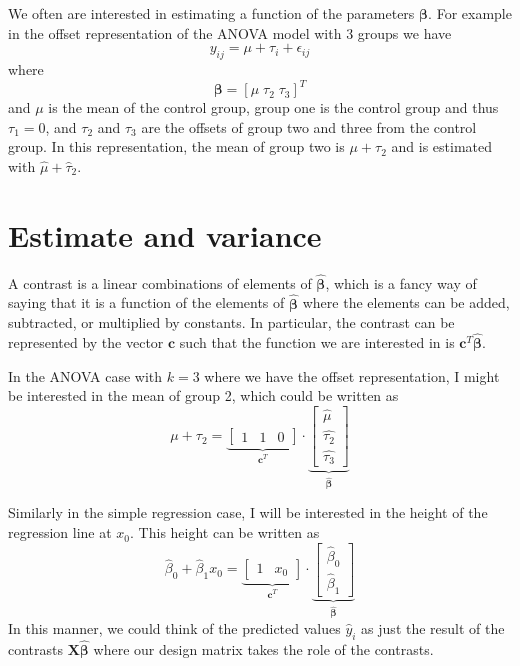 \documentclass[]{book}
\theoremstyle{definition}
\theoremstyle{definition}
\theoremstyle{remark}
\begin{document}
We often are interested in estimating a function of the parameters
\(\boldsymbol{\beta}\). For example in the offset representation of the
ANOVA model with 3 groups we have \[y_{ij}=\mu+\tau_{i}+\epsilon_{ij}\]
where \[
\boldsymbol{\beta}=\left[\mu\;\tau_{2}\;\tau_{3}\right]^{T}
\] and \(\mu\) is the mean of the control group, group one is the
control group and thus \(\tau_{1}=0\), and \(\tau_{2}\) and \(\tau_{3}\)
are the offsets of group two and three from the control group. In this
representation, the mean of group two is \(\mu+\tau_{2}\) and is
estimated with \(\hat{\mu} + \hat{\tau}_2\).

\section{Estimate and variance}\label{estimate-and-variance}

A contrast is a linear combinations of elements of
\(\boldsymbol{\hat{\beta}}\), which is a fancy way of saying that it is
a function of the elements of \(\boldsymbol{\hat{\beta}}\) where the
elements can be added, subtracted, or multiplied by constants. In
particular, the contrast can be represented by the vector
\(\boldsymbol{c}\) such that the function we are interested in is
\(\boldsymbol{c}^{T}\boldsymbol{\hat{\beta}}\).

In the ANOVA case with \(k=3\) where we have the offset representation,
I might be interested in the mean of group 2, which could be written as
\[
\mu+\tau_{2}=\underset{\boldsymbol{c}^{T}}{\underbrace{\left[\begin{array}{ccc}
1 & 1 & 0\end{array}\right]}}\cdot\underset{\hat{\boldsymbol{\beta}}}{\underbrace{\left[\begin{array}{c}
\hat{\mu}\\
\hat{\tau_{2}}\\
\hat{\tau_{3}}
\end{array}\right]}}
\]

Similarly in the simple regression case, I will be interested in the
height of the regression line at \(x_0\). This height can be written
as\\
\[
\hat{\beta}_{0}+\hat{\beta}_{1}x_{0}=\underset{\boldsymbol{c}^{T}}{\underbrace{\left[\begin{array}{cc}
1 & x_{0}\end{array}\right]}}\cdot\underset{\hat{\boldsymbol{\beta}}}{\underbrace{\left[\begin{array}{c}
\hat{\beta}_{0}\\
\hat{\beta}_{1}
\end{array}\right]}}
\] In this manner, we could think of the predicted values \(\hat{y}_i\)
as just the result of the contrasts
\(\boldsymbol{X} \hat{\boldsymbol{\beta}}\) where our design matrix
takes the role of the contrasts.
\end{document}
